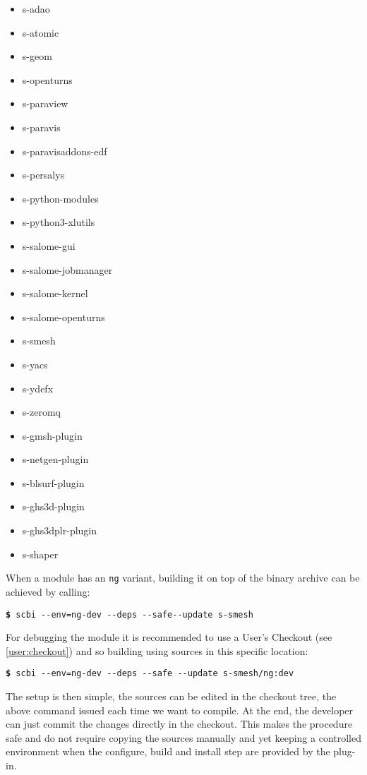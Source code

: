 \documentclass[a4paper,12pt,twoside]{article}
\newcommand{\code}[1]{\texttt{#1}}
\newcommand{\cmd}[1]{\tabto{1cm}\hspace{0.5cm}\texttt{\textbf{\$} #1}}
\newcommand{\ddash}{-{}-}
\begin{document}
\begin{itemize}
	\item s-adao
	\item s-atomic
	\item s-geom
	\item s-openturns
	\item s-paraview
	\item s-paravis
	\item s-paravisaddons-edf
	\item s-persalys
	\item s-python-modules
	\item s-python3-xlutils
	\item s-salome-gui
	\item s-salome-jobmanager
	\item s-salome-kernel
	\item s-salome-openturns
	\item s-smesh
	\item s-yacs
	\item s-ydefx
        \item s-zeromq
        \item s-gmsh-plugin
        \item s-netgen-plugin
        \item s-blsurf-plugin
        \item s-ghs3d-plugin
        \item s-ghs3dplr-plugin
        \item s-shaper
\end{itemize}

When a module has an \code{ng} variant, building it on top of the binary archive can be achieved by calling:

\cmd{scbi \ddash{}env=ng-dev \ddash{}deps \ddash{}safe\ddash{}update s-smesh}

For debugging the module it is recommended to use a User's Checkout (see \ref{user:checkout}) and so building using sources in this specific location:

\cmd{scbi \ddash{}env=ng-dev \ddash{}deps \ddash{}safe \ddash{}update s-smesh/ng:dev}

The setup is then simple, the sources can be edited in the checkout tree, the above command issued each time we want to compile. At the end, the developer can just commit the changes directly in the checkout. This makes the procedure safe and do not require copying the sources manually and yet keeping a controlled environment when the configure, build and install step are provided by the plug-in.
\end{document}
